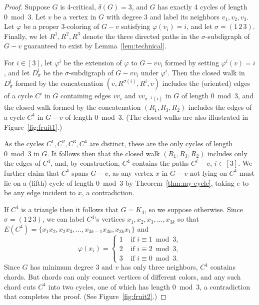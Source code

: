 \documentclass[12pt]{article}
\numberwithin{theorem}{section}
\begin{document}
\begin{proof}
    Suppose $G$ is 4-critical, $\delta(G)=3$, and $G$ has exactly 4 cycles of length $0 \bmod 3$. Let $v$ be a vertex in $G$ with degree 3 and label its neighbors $v_1,v_2,v_3$.  Let $\varphi$ be a proper $3$-coloring of $G-v$ satisfying $\varphi(v_i)=i$, and let $\sigma=(1\,2\,3)$. Finally, we let $R^1,R^2,R^3$ denote the three directed paths in the $\sigma$-subdigraph of $G-v$ guaranteed to exist by Lemma~\ref{lem:technical}.

    For $i \in [3]$, let $\varphi^i$ be the extension of $\varphi$ to $G-vv_i$ formed by setting $\varphi^i(v)=i$, and let $D_{\sigma}^i$ be the $\sigma$-subdigraph of $G-vv_i$ under $\varphi^i$.  Then the closed walk in $D_{\sigma}^i$ formed by the concatenation $(v,R^{\sigma(i)},R^i,v)$ includes the (oriented) edges of a cycle $C^i$ in $G$ containing edges $vv_i$ and $vv_{\sigma^{-1}(i)}$ in $G$ of length $0\bmod 3$, and the closed walk formed by the concatenation $(R_1,R_3,R_2)$ includes the edges of a cycle $C^4$ in $G-v$ of length $0\bmod 3$.  (The closed walks are also illustrated in Figure~\ref{fig:fruit1}.)

    As the cycles $C^1,C^2,C^3,C^4$ are distinct, these are the only cycles of length $0\bmod 3$ in $G$. It follows then that the closed walk $(R_1,R_3,R_2)$ includes only the edges of $C^4$, and, by construction, $C^4$ contains the paths $C^i-v$, $i \in [3]$.  We further claim that $C^4$ spans $G-v$, as any vertex $x$ in $G-v$ not lying on $C^4$ must lie on a (fifth) cycle of length $0\bmod 3$ by Theorem~\ref{thm:my-cycle}, taking $e$ to be any edge incident to $x$, a contradiction.


    If $C^4$ is a triangle then it follows that $G=K_4$, so we suppose otherwise.  Since $\sigma=(1\,2\,3)$, we can label $C^4$'s vertices $x_1,x_2,x_3,\ldots,x_{3k}$ so that $E(C^4)=\{x_1x_2,x_2x_3,\ldots,x_{3k-1}x_{3k},x_{3k}x_1\}$ and
    \[\varphi(x_i) = \begin{cases}
    1 & \mbox{ if } i \equiv 1\bmod 3,\\
    2 & \mbox{ if } i \equiv 2\bmod 3,\\
    3 & \mbox{ if } i \equiv 0\bmod 3.
    \end{cases}\]
    Since $G$ has minimum degree 3 and $v$ has only three neighbors, $C^4$ contains chords. But chords can only connect vertices of different colors, and any such chord cuts $C^4$ into two cycles, one of which has length $0 \bmod 3$, a contradiction that completes the proof. (See Figure~\ref{fig:fruit2}.)


\end{proof}
\end{document}
